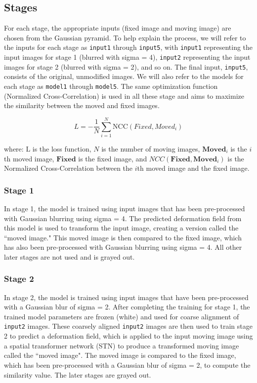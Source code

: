 \documentclass{book}
\begin{document}
	\subsection{Stages}
	For each stage, the appropriate inputs (fixed image and moving image) are chosen from the Gaussian pyramid. To help explain the process, we will refer to the inputs for each stage as \texttt{input1} through \texttt{input5}, with \texttt{input1} representing the input images for stage 1 (blurred with sigma = 4), \texttt{input2} representing the input images for stage 2 (blurred with sigma = 2), and so on. The final input, \texttt{input5}, consists of the original, unmodified images. We will also refer to the models for each stage as \texttt{model1} through \texttt{model5}. The same optimization function (Normalized Cross-Correlation) is used in all these stage and aims to maximize the similarity between the moved and fixed images.
	
	\begin{equation}
		L = -\frac{1}{N} \sum_{i=1}^N \text{NCC}(Fixed, Moved_i)
	\end{equation}
	
	where:
		$\text{L}$ is the loss function, $N$ is the number of moving images, $\mathbf{Moved}_i$ is the $i$th moved image, $\mathbf{Fixed}$ is the fixed image, and $NCC(\mathbf{Fixed}, \mathbf{Moved}_i)$ is the Normalized Cross-Correlation between the $i$th moved image and the fixed image.
	
	\subsubsection{Stage 1}
	In stage 1, the model is trained using input images that has been pre-processed with Gaussian blurring using sigma = 4. The predicted deformation field from this model is used to transform the input image, creating a version called the ``moved image." This moved image is then compared to the fixed image, which has also been pre-processed with Gaussian blurring using sigma = 4. All other later stages are not used and is grayed out.
	
	\subsubsection{Stage 2}
	In stage 2, the model is trained using input images that have been pre-processed with a Gaussian blur of sigma = 2. After completing the training for stage 1, the trained model parameters are frozen (white) and used for coarse alignment of \texttt{input2} images. These coarsely aligned \texttt{input2} images are then used to train stage 2 to predict a deformation field, which is applied to the input moving image using a spatial transformer network (STN) to produce a transformed moving image called the ``moved image". The moved image is compared to the fixed image, which has been pre-processed with a Gaussian blur of sigma = 2, to compute the similarity value. The later stages are grayed out.
	
\end{document}
